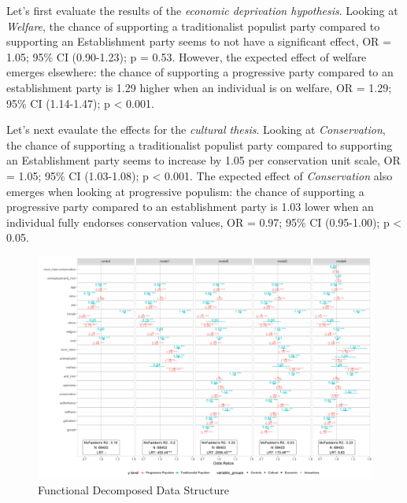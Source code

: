 \documentclass[]{article}
\begin{document}
Let's first evaluate the results of the \emph{economic deprivation
hypothesis}. Looking at \emph{Welfare}, the chance of supporting a
traditionalist populist party compared to supporting an Establishment
party seems to not have a significant effect, OR = 1.05; 95\% CI
(0.90-1.23); p = 0.53. However, the expected effect of welfare emerges
elsewhere: the chance of supporting a progressive party compared to an
establishment party is 1.29 higher when an individual is on welfare, OR
= 1.29; 95\% CI (1.14-1.47); p \textless{} 0.001.

Let's next evaulate the effects for the \emph{cultural thesis}. Looking
at \emph{Conservation}, the chance of supporting a traditionalist
populist party compared to supporting an Establishment party seems to
increase by 1.05 per conservation unit scale, OR = 1.05; 95\% CI
(1.03-1.08); p \textless{} 0.001. The expected effect of
\emph{Conservation} also emerges when looking at progressive populism:
the chance of supporting a progressive party compared to an
establishment party is 1.03 lower when an individual fully endorses
conservation values, OR = 0.97; 95\% CI (0.95-1.00); p \textless{} 0.05.

\begin{landscape}
\begin{figure}[htpb]
  \includegraphics[height=1.2\textheight, width=1.5\textwidth]{images/onebigmotherfucker.png}
  \caption{Functional Decomposed Data Structure}
\end{figure}
\end{landscape}
\end{document}
